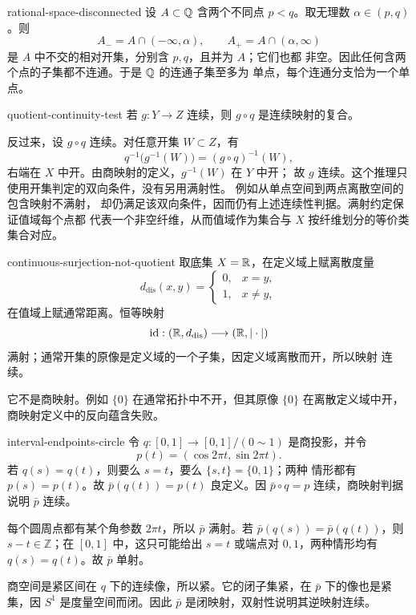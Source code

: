 \begin{solution}{rational-space-disconnected}
设 \(A\subset\mathbb{Q}\) 含两个不同点 \(p<q\)。取无理数
\(\alpha\in(p,q)\)。则
\[
 A_-=A\cap(-\infty,\alpha),\qquad
 A_+=A\cap(\alpha,\infty)
\]
是 \(A\) 中不交的相对开集，分别含 \(p,q\)，且并为 \(A\)；它们也都
非空。因此任何含两个点的子集都不连通。于是 \(\mathbb{Q}\) 的连通子集至多为
单点，每个连通分支恰为一个单点。
\end{solution}

\begin{solution}{quotient-continuity-test}
若 \(g:Y\to Z\) 连续，则 \(g\circ q\) 是连续映射的复合。

反过来，设 \(g\circ q\) 连续。对任意开集 \(W\subset Z\)，有
\[
 q^{-1}\bigl(g^{-1}(W)\bigr)=(g\circ q)^{-1}(W),
\]
右端在 \(X\) 中开。由商映射的定义，\(g^{-1}(W)\) 在 \(Y\) 中开；
故 \(g\) 连续。这个推理只使用开集判定的双向条件，没有另用满射性。
例如从单点空间到两点离散空间的包含映射不满射，
却仍满足该双向条件，因而仍有上述连续性判据。满射约定保证值域每个点都
代表一个非空纤维，从而值域作为集合与 \(X\) 按纤维划分的等价类集合对应。
\end{solution}

\begin{solution}{continuous-surjection-not-quotient}
取底集 \(X=\mathbb{R}\)，在定义域上赋离散度量
\[
 d_{\mathrm{dis}}(x,y)=
 \begin{cases}0,&x=y,\\1,&x\ne y,\end{cases}
\]
在值域上赋通常距离。恒等映射
\[
 \operatorname{id}:(\mathbb{R},d_{\mathrm{dis}})\longrightarrow(\mathbb{R},|\cdot|)
\]
满射；通常开集的原像是定义域的一个子集，因定义域离散而开，所以映射
连续。

它不是商映射。例如 \(\{0\}\) 在通常拓扑中不开，但其原像 \(\{0\}\)
在离散定义域中开，商映射定义中的反向蕴含失败。
\end{solution}

\begin{solution}{interval-endpoints-circle}
令 \(q:[0,1]\to[0,1]/(0\sim1)\) 是商投影，并令
\[
 p(t)=(\cos2\pi t,\sin2\pi t).
\]
若 \(q(s)=q(t)\)，则要么 \(s=t\)，要么 \(\{s,t\}=\{0,1\}\)；两种
情形都有 \(p(s)=p(t)\)。故
\(\bar p(q(t))=p(t)\) 良定义。因
\(\bar p\circ q=p\) 连续，商映射判据说明 \(\bar p\) 连续。

每个圆周点都有某个角参数 \(2\pi t\)，所以 \(\bar p\) 满射。若
\(\bar p(q(s))=\bar p(q(t))\)，则 \(s-t\in\mathbb Z\)；在
\([0,1]\) 中，这只可能给出 \(s=t\) 或端点对 \(0,1\)，两种情形均有
\(q(s)=q(t)\)。故 \(\bar p\) 单射。

商空间是紧区间在 \(q\) 下的连续像，所以紧。它的闭子集紧，在
\(\bar p\) 下的像也是紧集，因 \(S^1\) 是度量空间而闭。因此
\(\bar p\) 是闭映射，双射性说明其逆映射连续。
\end{solution}

